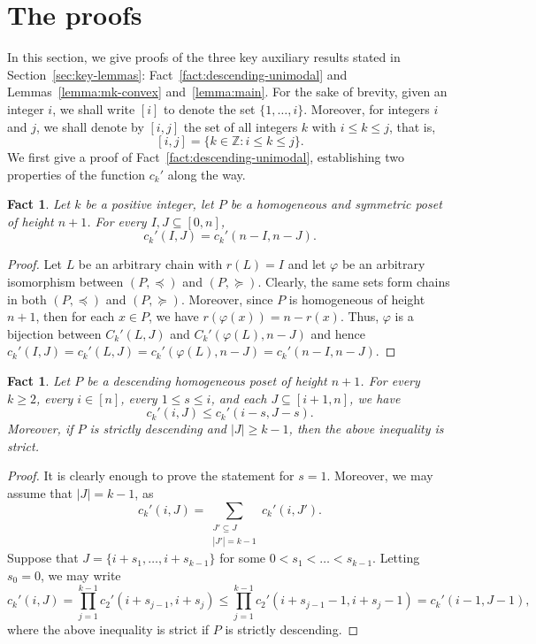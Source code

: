 \documentclass[11pt,a4paper,reqno]{amsart}
\newtheorem{fact}[thm]{Fact}
\numberwithin{claim}{thm}
\theoremstyle{definition}
\newcommand{\Int}{\mathbb{Z}}
\renewcommand{\le}{\leqslant}
\renewcommand{\ge}{\geqslant}
\newcommand{\pl}{\preceq}
\newcommand{\pg}{\succeq}
\begin{document}
\section{The proofs}
\label{sec:proofs}

In this section, we give proofs of the three key auxiliary results stated in Section~\ref{sec:key-lemmas}: Fact~\ref{fact:descending-unimodal} and Lemmas~\ref{lemma:mk-convex} and~\ref{lemma:main}. For the sake of brevity, given an integer $i$, we shall write $[i]$ to denote the set $\{1, \dotsc, i\}$. Moreover, for integers $i$ and $j$, we shall denote by $[i,j]$ the set of all integers $k$ with $i \le k \le j$, that is,
\[
  [i,j] = \{k \in \Int \colon i \le k \le j\}.
\]
We first give a proof of Fact~\ref{fact:descending-unimodal}, establishing two properties of the function $c_k'$ along the way.

\begin{fact}
  \label{fact:ckIJ-sym}
  Let $k$ be a positive integer, let $P$ be a homogeneous and symmetric poset of height $n+1$. For every $I, J \subseteq [0,n]$,
  \[
    c_k'(I, J) = c_k'(n-I, n-J).
  \]
\end{fact}
\begin{proof}
  Let $L$ be an arbitrary chain with $r(L) = I$ and let $\varphi$ be an arbitrary isomorphism between $(P, \pl)$ and $(P, \pg)$. Clearly, the same sets form chains in both $(P, \pl)$ and $(P, \pg)$. Moreover, since $P$ is homogeneous of height $n+1$, then for each $x \in P$, we have $r(\varphi(x)) = n-r(x)$. Thus, $\varphi$ is a bijection between $C_k'(L, J)$ and $C_k'(\varphi(L), n-J)$ and hence $c_k'(I,J) = c_k'(L, J) = c_k'(\varphi(L), n-J) = c_k'(n-I, n-J)$.
\end{proof}

\begin{fact}
  \label{fact:ckiJ-shift}
  Let $P$ be a descending homogeneous poset of height $n+1$. For every $k \ge 2$, every $i \in [n]$, every $1 \le s \le i$, and each $J \subseteq [i+1,n]$, we have
  \[
    c_k'(i, J) \le c_k'(i-s, J-s).
  \]
  Moreover, if $P$ is strictly descending and $|J| \ge k-1$, then the above inequality is strict.
\end{fact}
\begin{proof}
  It is clearly enough to prove the statement for $s = 1$. Moreover, we may assume that $|J| = k-1$, as
  \[
    c_k'(i, J) = \sum_{\substack{J' \subseteq J \\ |J'| = k-1}} c_k'(i, J').
  \]
  Suppose that $J = \{i + s_1, \dotsc, i + s_{k-1}\}$ for some $0 < s_1 < \dotsc < s_{k-1}$. Letting $s_0 = 0$, we may write
  \[
    c_k'(i, J) = \prod_{j = 1}^{k-1} c_2'(i+s_{j-1}, i+s_j) \le \prod_{j = 1}^{k-1} c_2'(i+s_{j-1}-1, i+s_j-1) = c_k'(i-1, J-1),
  \]
  where the above inequality is strict if $P$ is strictly descending.
\end{proof}
\end{document}
